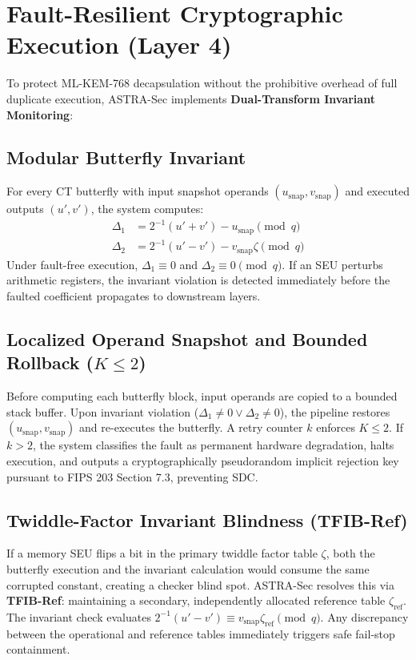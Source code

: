 \documentclass[conference,10pt]{IEEEtran}
\begin{document}
\section{Fault-Resilient Cryptographic Execution (Layer 4)}
\label{sec:layer4}

To protect ML-KEM-768 decapsulation without the prohibitive overhead of full duplicate execution, ASTRA-Sec implements \textbf{Dual-Transform Invariant Monitoring}:

\subsection{Modular Butterfly Invariant}
For every CT butterfly with input snapshot operands $(u_{\text{snap}}, v_{\text{snap}})$ and executed outputs $(u', v')$, the system computes:
\begin{align}
    \Delta_1 &= 2^{-1}(u' + v') - u_{\text{snap}} \pmod q \\
    \Delta_2 &= 2^{-1}(u' - v') - v_{\text{snap}}\zeta \pmod q
\end{align}
Under fault-free execution, $\Delta_1 \equiv 0$ and $\Delta_2 \equiv 0 \pmod q$. If an SEU perturbs arithmetic registers, the invariant violation is detected immediately before the faulted coefficient propagates to downstream layers.

\subsection{Localized Operand Snapshot and Bounded Rollback ($K \le 2$)}
Before computing each butterfly block, input operands are copied to a bounded stack buffer. Upon invariant violation ($\Delta_1 \ne 0 \lor \Delta_2 \ne 0$), the pipeline restores $(u_{\text{snap}}, v_{\text{snap}})$ and re-executes the butterfly. A retry counter $k$ enforces $K \le 2$. If $k > 2$, the system classifies the fault as permanent hardware degradation, halts execution, and outputs a cryptographically pseudorandom implicit rejection key pursuant to FIPS 203 Section 7.3, preventing SDC.

\subsection{Twiddle-Factor Invariant Blindness (TFIB-Ref)}
If a memory SEU flips a bit in the primary twiddle factor table $\zeta$, both the butterfly execution and the invariant calculation would consume the same corrupted constant, creating a checker blind spot. ASTRA-Sec resolves this via \textbf{TFIB-Ref}: maintaining a secondary, independently allocated reference table $\zeta_{\text{ref}}$. The invariant check evaluates $2^{-1}(u' - v') \equiv v_{\text{snap}}\zeta_{\text{ref}} \pmod q$. Any discrepancy between the operational and reference tables immediately triggers safe fail-stop containment.
\end{document}
